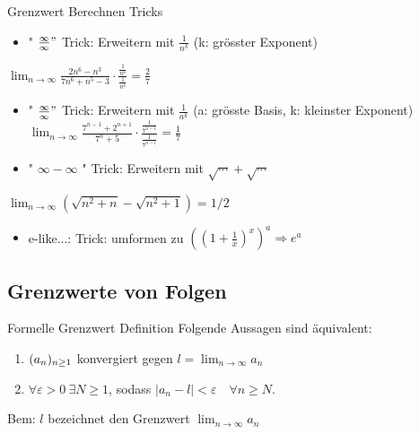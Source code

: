\begin{KR}{Grenzwert Berechnen Tricks}
    \begin{itemize}
        \item " $\frac{\infty}{\infty} "$ Trick: Erweitern mit $\frac{1}{n^{k}}$ (k: grösster Exponent)
    \end{itemize}
    
    $\lim _{n \rightarrow \infty} \frac{2 n^{6}-n^{3}}{7 n^{6}+n^{5}-3} \cdot \frac{\frac{1}{n^{6}}}{\frac{1}{n^{6}}}=\frac{2}{7}$
    
    \begin{itemize}
        \item " $\frac{\infty}{\infty} "$ Trick: Erweitern mit $\frac{1}{a^{k}}$ (a: grösste Basis, k: kleinster Exponent) $\lim _{n \rightarrow \infty} \frac{7^{n-1}+2^{n+1}}{7^{n}+5} \cdot \frac{\frac{1}{7^{n-1}}}{\frac{1}{7^{n-1}}}=\frac{1}{7}$
        \item " $\infty-\infty$ " Trick: Erweitern mit $\sqrt{\cdots}+\sqrt{\cdots}$
    \end{itemize}
    
    $\lim _{n \rightarrow \infty}\left(\sqrt{n^{2}+n}-\sqrt{n^{2}+1}\right)=1 / 2$
    
    \begin{itemize}
        \item e-like...: Trick: umformen zu $\left(\left(1+\frac{1}{x}\right)^{x}\right)^{a} \Rightarrow e^{a}$
    \end{itemize}
\end{KR}

\raggedcolumns
\columnbreak

\subsection{Grenzwerte von Folgen}

\begin{definition}{Formelle Grenzwert Definition}
    Folgende Aussagen sind äquivalent:
    \begin{enumerate}
        \item $(a_n)_{n \geq 1}$ konvergiert gegen $l = \lim_{n \to \infty} a_n$
        \item $\forall \varepsilon > 0~\exists N \geq 1$, sodass $|a_n -l | < \varepsilon \quad \forall n \geq N$.
    \end{enumerate}
\end{definition}

\begin{remark}
    Bem: $l$ bezeichnet den Grenzwert $\lim_{n \to \infty} a_n$
\end{remark}

